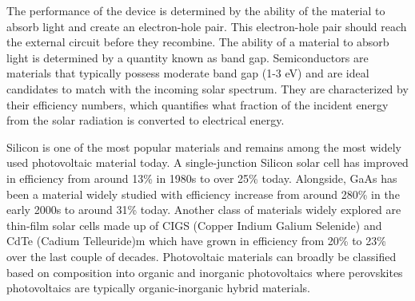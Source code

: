\documentclass[book.tex]{subfiles}
\begin{document}
The performance of the device is determined by the ability of the material to absorb light and create an electron-hole pair.  This electron-hole pair should reach the external circuit before they recombine.  The ability of a material to absorb light is determined by a quantity known as band gap.  Semiconductors are materials that typically possess moderate band gap (1-3 eV) and are ideal candidates to match with the incoming solar spectrum.  They are characterized by their efficiency numbers, which quantifies what fraction of the incident energy from the solar radiation is converted to electrical energy.

Silicon is one of the most popular materials and remains among the most widely used photovoltaic material today.  A single-junction Silicon solar cell has improved in efficiency from around 13\% in 1980s to over 25\% today.   Alongside, GaAs has been a material widely studied with efficiency increase from around 280\% in the early 2000s to around 31\% today. Another class of materials widely explored are thin-film solar cells made up of CIGS (Copper Indium Galium Selenide) and CdTe (Cadium Telleuride)m which have grown in efficiency from 20\% to 23\% over the last couple of decades. Photovoltaic materials can broadly be classified based on composition into organic and inorganic photovoltaics where perovskites photovoltaics are typically organic-inorganic hybrid materials. 
\end{document}
